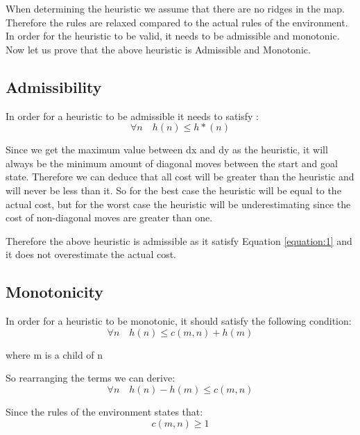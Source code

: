\documentclass{article}
\begin{document}
	 When determining the heuristic we assume that there are no ridges in the map. Therefore the rules are relaxed compared to the actual rules of the environment. 
	In order for the heuristic to be valid, it needs to be admissible and monotonic. Now let us prove that the above heuristic is Admissible and Monotonic.
	
	\subsection{Admissibility}
	
		In order for a heuristic to be admissible it needs to satisfy :
		\begin{equation}
			\forall n \quad h(n) \le h*(n) \label{equation:1}
		\end{equation}
				
		Since we get the maximum value between dx and dy as the heuristic, it will always be the minimum amount of diagonal moves between the start and goal state. Therefore we can deduce that all cost will be greater than the heuristic and will never be less than it. So for the best case the heuristic will be equal to the actual cost, but for the worst case the heuristic will be underestimating since the cost of non-diagonal moves are greater than one.
		
		Therefore the above heuristic is admissible as it satisfy Equation \ref{equation:1} and it does not overestimate the actual cost.
		
	\subsection{Monotonicity}
		In order for a heuristic to be monotonic, it should satisfy the following condition:
		\begin{equation}
			\forall n \quad h(n) \le c(m,n) + h(m) \label{equation:5}
		\end{equation}
		\begin{center}
			where m is a child of n
		\end{center}
	
	So rearranging the terms we can derive:
	\begin{equation}
		\forall n \quad h(n) - h(m)\le c(m,n)  \label{equation:6}
	\end{equation}

	Since the rules of the environment states that:
	\begin{equation}
		c(m,n) \ge 1
	\end{equation}
	
\end{document}
